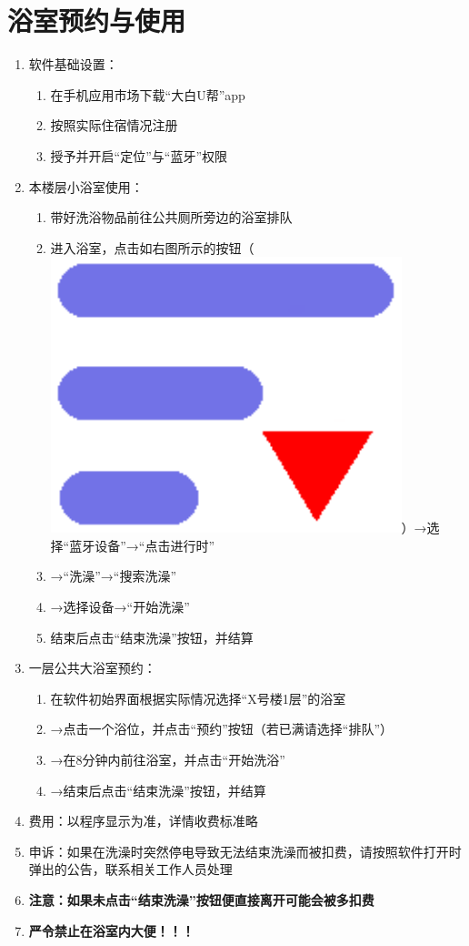 \section[浴室预约与使用]{浴室预约与使用}
\label{shower_software}
\begin{enumerate}
      \item 软件基础设置：
            \begin{enumerate}
                  \item 在手机应用市场下载“大白U帮”app
                  \item 按照实际住宿情况注册
                  \item 授予并开启“定位”与“蓝牙”权限
            \end{enumerate}
      \item 本楼层小浴室使用：
            \begin{enumerate}
                  \item 带好洗浴物品前往公共厕所旁边的浴室排队
                  \item 进入浴室，点击如右图所示的按钮（\mbox{\includegraphics[height=2.4ex]{bath.pdf}}）→选择“蓝牙设备”→“点击进行时”
                  \item →“洗澡”→“搜索洗澡”\footnotemark
                  \item →选择设备\footnotemark →“开始洗澡”
                  \item 结束后点击“结束洗澡”按钮，并结算
            \end{enumerate}
      \item 一层公共大浴室预约：
            \begin{enumerate}
                  \item 在软件初始界面根据实际情况选择“X号楼1层”的浴室
                  \item →点击一个浴位，并点击“预约”按钮（若已满请选择“排队”）
                  \item →在8分钟内前往浴室，并点击“开始洗浴”
                  \item →结束后点击“结束洗澡”按钮，并结算
            \end{enumerate}
      \item 费用：以程序显示为准，详情收费标准略
      \item 申诉：如果在洗澡时突然停电导致无法结束洗澡而被扣费，请按照软件打开时弹出的公告，联系相关工作人员处理
      \item \textbf{注意：如果未点击“结束洗澡”按钮便直接离开可能会被多扣费}
      \item \textbf{严令禁止在浴室内大便！！！}
\end{enumerate}

